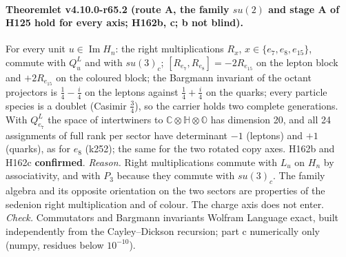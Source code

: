 \paragraph{Theoremlet v4.10.0-r65.2 (route A, the family \(su(2)\) and stage A of H125 hold for every axis; H162b, c; b not blind).}
For every unit \(u\in\operatorname{Im}H_n\): the right multiplications \(R_x\), \(x\in\{e_7,e_8,e_{15}\}\), commute with \(Q^L_u\) and with
\(su(3)_c\); \([R_{e_7},R_{e_8}]=-2R_{e_{15}}\) on the lepton block and \(+2R_{e_{15}}\) on the coloured block; the Bargmann invariant of the octant
projectors is \(\tfrac14-\tfrac i4\) on the leptons against \(\tfrac14+\tfrac i4\) on the quarks; every particle species is a doublet (Casimir
\(\tfrac34\)), so the carrier holds two complete generations.  With \(Q^L_{e_7}\) the space of intertwiners to
\(\mathbb C\otimes\mathbb H\otimes\mathbb O\) has dimension 20, and all 24 assignments of full rank per sector have determinant \(-1\) (leptons) and
\(+1\) (quarks), as for \(e_8\) (k252); the same for the two rotated copy axes.  H162b and H162c \textbf{confirmed}.
\emph{Reason.}  Right multiplications commute with \(L_u\) on \(H_n\) by associativity, and with \(P_3\) because they commute with \(su(3)_c\).  The
family algebra and its opposite orientation on the two sectors are properties of the sedenion right multiplication and of colour.  The charge
axis does not enter.
\emph{Check.} Commutators and Bargmann invariants Wolfram Language exact, built independently from the Cayley--Dickson recursion; part c numerically
only (numpy, residues below \(10^{-10}\)).

